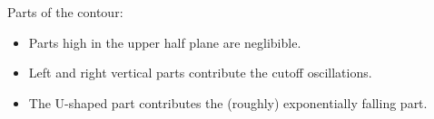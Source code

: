 \documentclass{beamer}
\begin{document}



\begin{frame}
Parts of the contour:

\begin{itemize}
\item Parts high in the upper half plane are neglibible.


\pause
\item Left and right vertical parts contribute the cutoff oscillations.


\pause
\item The U-shaped part contributes the (roughly) exponentially falling part.


\end{itemize}
\end{frame}
\end{document}
